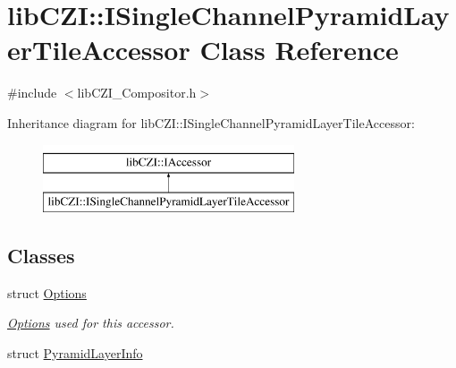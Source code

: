 \hypertarget{classlib_c_z_i_1_1_i_single_channel_pyramid_layer_tile_accessor}{}\section{lib\+C\+ZI\+:\+:I\+Single\+Channel\+Pyramid\+Layer\+Tile\+Accessor Class Reference}
\label{classlib_c_z_i_1_1_i_single_channel_pyramid_layer_tile_accessor}


{\ttfamily \#include $<$lib\+C\+Z\+I\+\_\+\+Compositor.\+h$>$}

Inheritance diagram for lib\+C\+ZI\+:\+:I\+Single\+Channel\+Pyramid\+Layer\+Tile\+Accessor\+:\begin{figure}[H]
\begin{center}
\leavevmode
\includegraphics[height=2.000000cm]{classlib_c_z_i_1_1_i_single_channel_pyramid_layer_tile_accessor}
\end{center}
\end{figure}
\subsection*{Classes}
\begin{DoxyCompactItemize}
\item 
struct \hyperlink{structlib_c_z_i_1_1_i_single_channel_pyramid_layer_tile_accessor_1_1_options}{Options}
\begin{DoxyCompactList}\small\item\em \hyperlink{structlib_c_z_i_1_1_i_single_channel_pyramid_layer_tile_accessor_1_1_options}{Options} used for this accessor. \end{DoxyCompactList}\item 
struct \hyperlink{structlib_c_z_i_1_1_i_single_channel_pyramid_layer_tile_accessor_1_1_pyramid_layer_info}{Pyramid\+Layer\+Info}
\end{DoxyCompactItemize}
